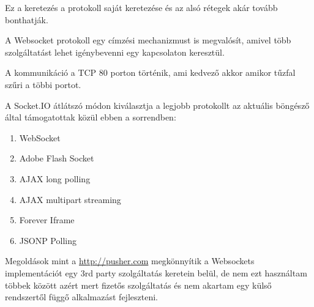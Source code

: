 Ez a keretezés a protokoll saját keretezése és az alsó rétegek akár tovább bonthatják.

A Websocket protokoll egy címzési mechanizmust is megvalósít, amivel több szolgáltatást lehet igénybevenni egy kapcsolaton keresztül.

A kommunikáció a TCP 80 porton történik, ami kedvező akkor amikor tűzfal szűri a többi portot. 




A Socket.IO átlátszó módon kiválasztja a legjobb protokollt az aktuális böngésző által támogatottak közül ebben a sorrendben:
\begin{enumerate}
\item{WebSocket}
\item{Adobe Flash Socket}
\item{AJAX long polling}
\item{AJAX multipart streaming}
\item{Forever Iframe}
\item{JSONP Polling}
\end{enumerate}



Megoldások mint a \url{http://pusher.com} megkönnyítik a Websockets implementációt egy 3rd party szolgáltatás keretein belül, de nem ezt használtam többek között azért mert fizetős szolgáltatás és nem akartam egy külső rendszertől függő alkalmazást fejleszteni.


